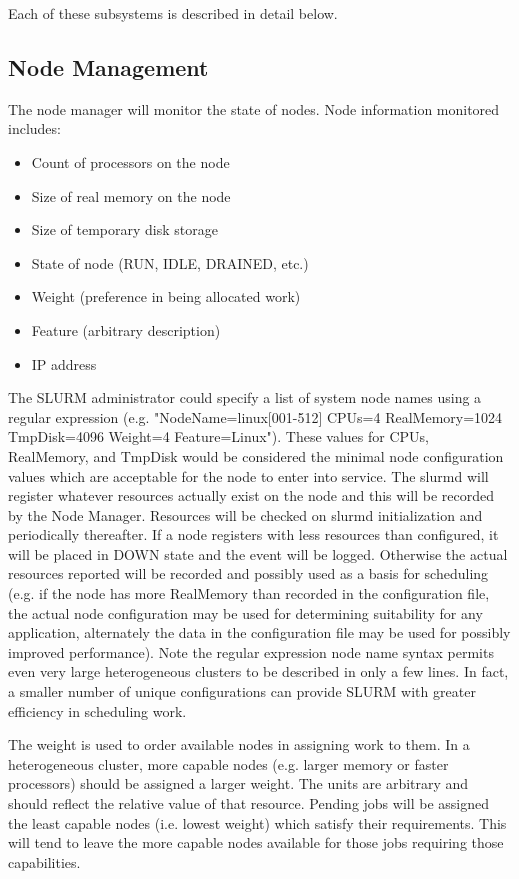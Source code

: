 Each of these subsystems is described in detail below.

\subsection{Node Management}

The node manager will monitor the state of nodes.  Node information
monitored includes:

\begin{itemize}
\item Count of processors on the node
\item Size of real memory on the node
\item Size of temporary disk storage
\item State of node (RUN, IDLE, DRAINED, etc.)
\item Weight (preference in being allocated work)
\item Feature (arbitrary description)
\item IP address
\end{itemize}

The SLURM administrator could specify a list of system node
names using a regular expression (e.g. "NodeName=linux[001-512] CPUs=4
RealMemory=1024 TmpDisk=4096 Weight=4 Feature=Linux").  These values
for CPUs, RealMemory, and TmpDisk would be considered the minimal
node configuration values which are acceptable for the node to enter
into service.  The slurmd will register whatever resources actually
exist on the node and this will be recorded by the Node Manager.
Resources will be checked on slurmd initialization and periodically
thereafter.  If a node registers with less resources than configured, it
will be placed in DOWN state and the event will be logged.  Otherwise the
actual resources reported will be recorded and possibly used as a basis 
for scheduling (e.g. if the node has more RealMemory than recorded in 
the configuration file, the actual node configuration may be used for 
determining suitability for any application, alternately the data in 
the configuration file may be used for possibly improved performance).
Note the regular expression node name syntax permits even very large
heterogeneous clusters to be described in only a few lines.  In fact,
a smaller number of unique configurations can provide SLURM with greater
efficiency in scheduling work.

The weight is used to order available nodes in assigning work to them.
In a heterogeneous cluster, more capable nodes (e.g. larger memory
or faster processors) should be assigned a larger weight.  The units
are arbitrary and should reflect the relative value of that resource.
Pending jobs will be assigned the least capable nodes (i.e. lowest
weight) which satisfy their requirements.  This will tend to leave the
more capable nodes available for those jobs requiring those capabilities.


